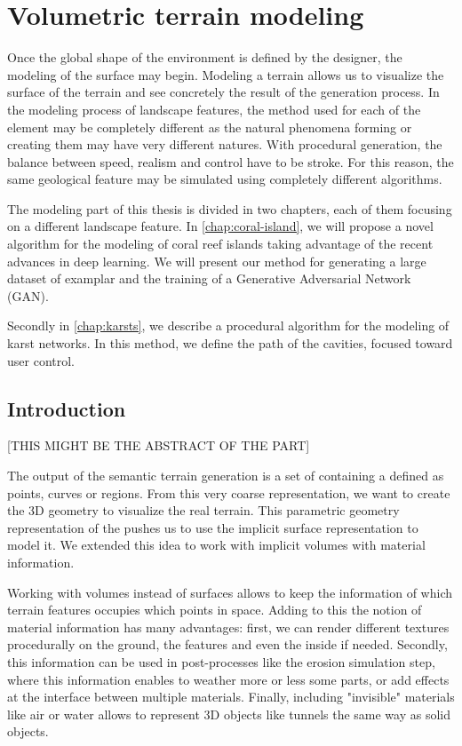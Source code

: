 \chapter{Volumetric terrain modeling}
\label{chap:volumic-modeling}

\abstract
\label{chap:modelisation-abstract}

Once the global shape of the environment is defined by the designer, the modeling of the surface may begin. Modeling a terrain allows us to visualize the surface of the terrain and see concretely the result of the generation process. In the modeling process of landscape features, the method used for each of the element may be completely different as the natural phenomena forming or creating them may have very different natures. With procedural generation, the balance between speed, realism and control have to be stroke. For this reason, the same geological feature may be simulated using completely different algorithms.

The modeling part of this thesis is divided in two chapters, each of them focusing on a different landscape feature. In \cref{chap:coral-island}, we will propose a novel algorithm for the modeling of coral reef islands taking advantage of the recent advances in deep learning. We will present our method for generating a large dataset of examplar and the training of a Generative Adversarial Network (GAN).

Secondly in \cref{chap:karsts}, we describe a procedural algorithm for the modeling of karst networks. In this method, we define the path of the cavities, focused toward user control.
\pagebreak 

\minitoc

\section{Introduction}
[THIS MIGHT BE THE ABSTRACT OF THE PART]

The output of the semantic terrain generation is a set of  containing a  defined as points, curves or regions. From this very coarse representation, we want to create the 3D geometry to visualize the real terrain. This parametric geometry representation of the  pushes us to use the implicit surface representation to model it. We extended this idea to work with implicit volumes with material information.

Working with volumes instead of surfaces allows to keep the information of which terrain features occupies which points in space. Adding to this the notion of material information has many advantages: first, we can render different textures procedurally on the ground, the features and even the inside if needed. Secondly, this information can be used in post-processes like the erosion simulation step, where this information enables to weather more or less some parts, or add effects at the interface between multiple materials. Finally, including "invisible" materials like air or water allows to represent 3D objects like tunnels the same way as solid objects.

